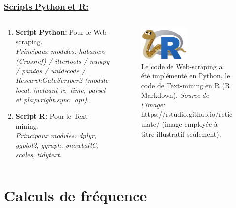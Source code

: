 \documentclass[xcolor=dvipsnames]{beamer}
\begin{document}
	\begin{frame}
		\frametitle{\underline{Scripts Python et R:}}
		\begin{columns}
			\begin{column}{0.5\textwidth} %
				\begin{enumerate}
					\item \textbf{Script Python:} Pour le Web-scraping. \\ \textit{Principaux modules: habanero (Crossref) / ittertools / numpy / pandas / unidecode / ResearchGateScraper2 (module local, incluant re, time, parsel et playwright.sync\_api)}.
					\item \textbf{Script R:} Pour le Text-mining. \\ \textit{Principaux modules: dplyr, ggplot2, ggraph, SnowballC, scales, tidytext.}
				\end{enumerate}
			\end{column}
			\begin{column}{0.5\textwidth}
				\begin{figure}[htb] %
					\begin{center} %
						\includegraphics[width=0.5\textwidth]{image_python_R.png}
						\caption{Le code de Web-scraping a été implémenté en Python, le code de Text-mining en R (R Markdown). \textit{Source de l'image:} https://rstudio.github.io/reticulate/ (image employée à titre illustratif seulement).}\label{fig_python_R}
					\end{center}
				\end{figure}
			\end{column}
		\end{columns}
	\end{frame}

	\section*{Calculs de fréquence}
\end{document}

